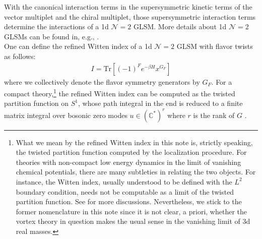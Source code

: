\documentclass[a4paper,11pt]{article}
\begin{document}
With the canonical interaction terms in the supersymmetric kinetic terms of the vector multiplet and the chiral multiplet, those supersymmetric interaction terms determine the interactions of a 1d $\mathcal N = 2$ GLSM. More details about 1d $\mathcal N = 2$ GLSMs can be found in, e.g., \cite{Hori:2014tda}.
\\



One can define the refined Witten index \cite{Witten:1982df,AlvarezGaume:1986nm} of a 1d $\mathcal N = 2$ GLSM with flavor twists as follows:
\begin{align}
I = \mathrm{Tr} \left[(-1)^F e^{-\beta H} x^{G_F}\right]
\end{align}
where we collectively denote the flavor symmetry generators by $G_F$. For a compact theory,\footnote{What we mean by the refined Witten index in this note is, strictly speaking, the twisted partition function computed by the localization
procedure. For theories with non-compact low energy dynamics in the limit of vanishing chemical potentials, there
 are many subtleties in relating the two objects. For instance, the Witten index, usually understood to be defined with the $L^2$ boundary condition, needs not be computable as a limit of the twisted partition function. See \cite{Lee:2016dbm} for more discussions. Nevertheless, we stick to the former nomenclature in this note since it is not clear, a priori, whether the vortex theory in question makes the usual
sense in the vanishing limit of 3d real masses.} the refined Witten index can be computed as the twisted partition function on $S^1$, whose path integral in the end is reduced to a finite matrix integral over bosonic zero modes $u \in (\mathbb C^*)^r$ where $r$ is the rank of $G$ \cite{Hwang:2014uwa,Cordova:2014oxa,Hori:2014tda}.
\end{document}

